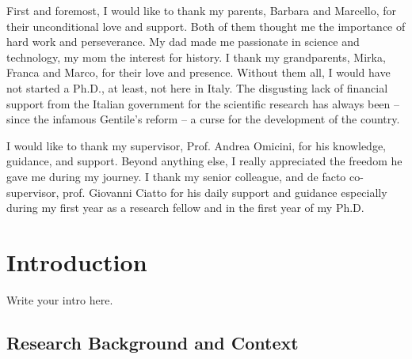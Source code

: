 \documentclass[12pt,a4paper,openright,twoside]{book}
\begin{document}
\begin{acknowledgements} %
    First and foremost, I would like to thank my parents, Barbara and Marcello, for their unconditional love and support.
    Both of them thought me the importance of hard work and perseverance.
    My dad made me passionate in science and technology, my mom the interest for history.
    I thank my grandparents, Mirka, Franca and Marco, for their love and presence.
    Without them all, I would have not started a Ph.D., at least, not here in Italy.
    The disgusting lack of financial support from the Italian government for the scientific research has always been -- since the infamous Gentile's reform -- a curse for the development of the country.

    I would like to thank my supervisor, Prof. Andrea Omicini, for his knowledge, guidance, and support.
    Beyond anything else, I really appreciated the freedom he gave me during my journey.
    I thank my senior colleague, and de facto co-supervisor, prof. Giovanni Ciatto for his daily support and guidance especially during my first year as a research fellow and in the first year of my Ph.D.

\end{acknowledgements}

\tableofcontents   
\listoffigures     %
\lstlistoflistings %

\mainmatter

\chapter{Introduction}
\label{ch:introduction}

Write your intro here.


\section{Research Background and Context}\label{sec:research-background-and-context}
\end{document}
